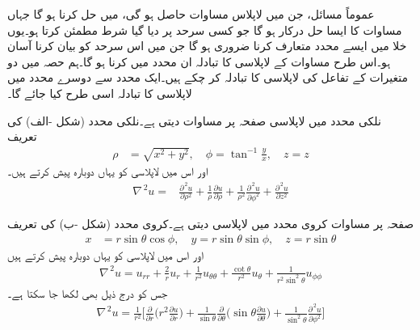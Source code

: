 عموماً مسائل، جن میں لاپلاس مساوات حاصل ہو گی، میں  حل کرنا ہو گا جہاں مساوات  کا ایسا حل درکار ہو گا جو کسی سرحد پر دیا گیا شرط مطمئن کرتا ہو۔یوں خلا میں ایسے محدد متعارف کرنا ضروری ہو گا جن میں اس سرحد کو بیان کرنا آسان  ہو۔اس طرح مساوات  کے لاپلاسی کا تبادلہ ان محدد میں کرنا ہو گا۔ہم حصہ  میں دو متغیرات کے تفاعل کی لاپلاسی کا تبادلہ کر چکے ہیں۔ایک محدد سے دوسرے محدد میں لاپلاسی کا تبادلہ اسی طرح کیا جائے گا۔

نلکی محدد میں لاپلاسی صفحہ  پر مساوات  دیتی ہے۔نلکی محدد (شکل -الف) کی تعریف
\begin{align}\label{مساوات_جزوی_تعریف_محددی_نظام_الف}
\rho&=\sqrt{x^2+y^2}, \quad \phi=\tan^{-1}\frac{y}{x},\quad z=z
\end{align}
 اور اس میں لاپلاسی کو یہاں دوبارہ پیش کرتے ہیں۔
\begin{align}\label{مساوات_جزوی_تعریف_محددی_نظام_ب}
\nabla^{\,2}u=&\frac{\partial^{\,2}u}{\partial \rho^2}+\frac{1}{\rho}\frac{\partial u}{\partial \rho}+\frac{1}{\rho^2}\frac{\partial^{\,2}u}{\partial \phi^2}+\frac{\partial^{\,2}u}{\partial z^2}
\end{align}

صفحہ  پر مساوات  کروی محدد میں لاپلاسی دیتی ہے۔کروی محدد (شکل -ب) کی تعریف
\begin{align}\label{مساوات_جزوی_تعریف_محددی_نظام_پ}
x&=r\sin\theta\cos\phi,\quad y=r\sin\theta\sin\phi,\quad z=r\sin\theta
\end{align}
 اور اس میں لاپلاسی کو یہاں دوبارہ پیش کرتے ہیں
\begin{align}\label{مساوات_جزوی_تعریف_محددی_نظام_ت}
\nabla^{\,2}u=u_{rr}+\frac{2}{r}u_r+\frac{1}{r^2}u_{\theta\theta}+\frac{\cot \theta}{r^2}u_{\theta}+\frac{1}{r^2\sin^2\theta}u_{\phi\phi}
\end{align}
جس کو درج ذیل بھی لکھا جا سکتا ہے۔
\begin{align}\label{مساوات_جزوی_تعریف_محددی_نظام_ٹ}
\nabla^{\,2}u=\frac{1}{r^2}\big[\frac{\partial}{\partial r}\big(r^2\frac{\partial u}{\partial r}\big)+\frac{1}{\sin \theta}\frac{\partial}{\partial \theta}\big(\sin \theta \frac{\partial u}{\partial \theta}\big)+\frac{1}{\sin^2\theta} \frac{\partial^{\,2}u}{\partial \phi^2}\big]
\end{align}

